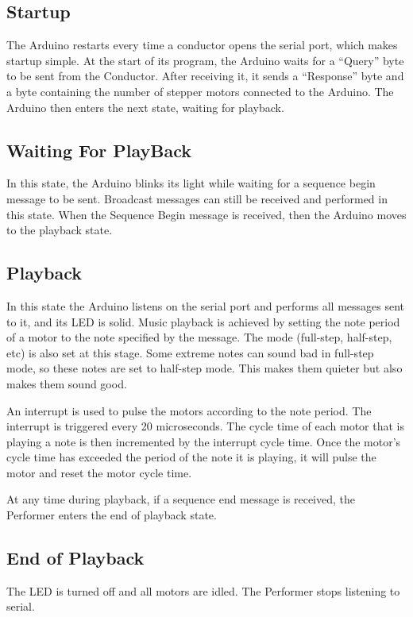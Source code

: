 \documentclass{article}
\begin{document}
\subsection{Startup}
\noindent The Arduino restarts every time a conductor opens the serial port, which makes startup simple. At the start of its program, the Arduino waits for a ``Query'' byte to be sent from the Conductor. After receiving it, it sends a ``Response'' byte and a byte containing the number of stepper motors connected to the Arduino. The Arduino then enters the next state, waiting for playback.

\subsection{Waiting For PlayBack}
\noindent In this state, the Arduino blinks its light while waiting for a sequence begin message to be sent. Broadcast messages can still be received and performed in this state. When the Sequence Begin message is received, then the Arduino moves to the playback state.

\subsection{Playback}
\noindent In this state the Arduino listens on the serial port and performs all messages sent to it, and its LED is solid. Music playback is achieved by setting the note period of a motor to the note specified by the message. The mode (full-step, half-step, etc) is also set at this stage. Some extreme notes can sound bad in full-step mode, so these notes are set to half-step mode. This makes them quieter but also makes them sound good.

\noindent An interrupt is used to pulse the motors according to the note period. The interrupt is triggered every 20 microseconds. The cycle time of each motor that is playing a note is then incremented by the interrupt cycle time. Once the motor's cycle time has exceeded the period of the note it is playing, it will pulse the motor and reset the motor cycle time.

\noindent At any time during playback, if a sequence end message is received, the Performer enters the end of playback state.

\subsection{End of Playback}
\noindent The LED is turned off and all motors are idled. The Performer stops listening to serial.
\end{document}

